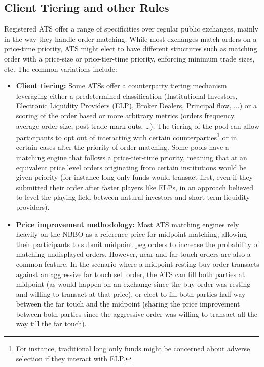 \subsection{Client Tiering and other Rules}

Registered ATS offer a range of specificities over regular public exchanges, mainly in the way they handle order matching. While most exchanges match orders on a price-time priority, ATS might elect to have different structures such as matching order with a price-size or price-tier-time priority, enforcing minimum trade sizes, etc. The common variations include:

\begin{itemize}
\item{\textbf{Client tiering:}} Some ATSs offer a counterparty tiering mechanism leveraging either a predetermined classification (Institutional Investors, Electronic Liquidity Providers (ELP), Broker Dealers, Principal flow, ...) or a scoring of the order based or more arbitrary metrics (orders frequency, average order size, post-trade mark outs, \dots). The tiering of the pool can allow participants to opt out of interacting with certain counterparties\footnote{For instance, traditional long only funds might be concerned about adverse selection if they interact with ELP.} or in certain cases alter the priority of order matching. Some pools have a matching engine that follows a price-tier-time priority, meaning that at an equivalent price level orders originating from certain institutions would be given priority (for instance long only funds would transact first, even if they submitted their order after faster players like ELPs, in an approach believed to level the playing field between natural investors and short term liquidity providers). 

\item{\textbf{Price improvement methodology:}} Most ATS matching engines rely heavily on the NBBO as a reference price for midpoint matching, allowing their participants to submit midpoint peg orders to increase the probability of matching undisplayed orders. However, near and far touch orders are also a common feature. In the scenario where a midpoint resting buy order transacts against an aggressive far touch sell order, the ATS can fill both parties at midpoint (as would happen on an exchange since the buy order was resting and willing to transact at that price), or elect to fill both parties half way between the far touch and the midpoint (sharing the price improvement between both parties since the aggressive order was willing to transact all the way till the far touch). 


\end{itemize}
